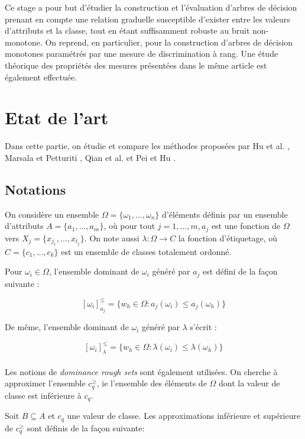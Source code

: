 \documentclass[a4paper]{article}
\begin{document}
Ce stage a pour but d'étudier la construction et l'évaluation d'arbres de
décision prenant en compte une relation graduelle susceptible d'exister entre
les valeurs d'attributs et la classe, tout en étant suffisamment robuste au
bruit non-monotone. On reprend, en particulier, \cite{marsala-rank} pour la
construction d'arbres de décision monotones paramétrés par une mesure de
discrimination à rang. Une étude théorique des propriétés des mesures présentées
dans le même article est également effectuée.\\

\section{Etat de l'art} 
Dans cette partie, on étudie et compare les méthodes proposées par Hu et al.
\cite{hu-rank}, Marsala et Petturiti \cite{marsala-rank}, Qian et al.
\cite{qian-fusing} et Pei et Hu \cite{pei-partially}.

\subsection*{Notations}
On considère un ensemble $\Omega = \{\omega_1,...,\omega_n\}$ d'éléments définis
par un ensemble d'attributs $A = \{a_1,...,a_m\}$, où pour tout $j=1,...,m, a_j$
est une fonction de $\Omega$ vers $X_j = \{x_{j_1},...,x_{t_j}\}$. On note aussi
$\lambda: \Omega \rightarrow C$ la fonction d'étiquetage, où $C =
\{c_1,...,c_k\}$ est un ensemble de classes totalement ordonné.

Pour $\omega_i \in \Omega$, l'ensemble dominant de $\omega_i$ généré par $a_j$
est défini de la façon suivante :

$$[\omega_i]^{\leq}_{a_j} = \{w_h \in \Omega : a_j(\omega_i) \leq a_j(\omega_h)\}$$

De même, l'ensemble dominant de $\omega_i$ généré par $\lambda$ s'écrit :

$$[\omega_i]^{\leq}_{\lambda} = \{w_h \in \Omega : \lambda(\omega_i) \leq
\lambda(\omega_h)\}$$ \\

Les notions de \textit{dominance rough sets} sont également utilisées. On
cherche à approximer l'ensemble $c^{\geq}_q$, ie l'ensemble des éléments de
$\Omega$ dont la valeur de classe est inférieure à $c_q$.

\noindent Soit $B \subseteq A$ et $c_q$ une valeur de classe. Les approximations
inférieure et supérieure de $c^{\geq}_q$ sont définis de la façon suivante:
\end{document}
